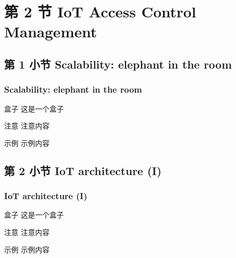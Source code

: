 \documentclass[
    aspectratio=169,                   %
]{beamer}
\begin{document}

        

\section{第 2 节 IoT Access Control Management}

\subsection{第 1 小节 Scalability: elephant in the room}

    \begin{frame}
        \frametitle{Scalability: elephant in the room}
        
        \begin{block}{盒子}
            这是一个盒子\cite{conoscenti}
        \end{block}

        \begin{alertblock}{注意}
            注意内容
        \end{alertblock}

        \begin{exampleblock}{示例}
            示例内容
        \end{exampleblock}
    \end{frame}

\subsection{第 2 小节 IoT architecture (I)}

    \begin{frame}
        \frametitle{IoT architecture (I)}
        
        \begin{block}{盒子}
            这是一个盒子\cite{novo}
        \end{block}

        \begin{alertblock}{注意}
            注意内容
        \end{alertblock}

        \begin{exampleblock}{示例}
            示例内容
        \end{exampleblock}
    \end{frame}
\end{document}
